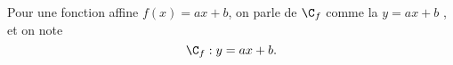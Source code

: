 


\pagestyle{fancy}
\fancyhead[R]{\today}


\begin{rpl}
	Pour une fonction affine $f(x) = ax+b$, on parle de $\C_f$ comme la  $y=ax+b$ \fg, et on note
		\[ \C_f : y = ax+b. \]
\end{rpl}



